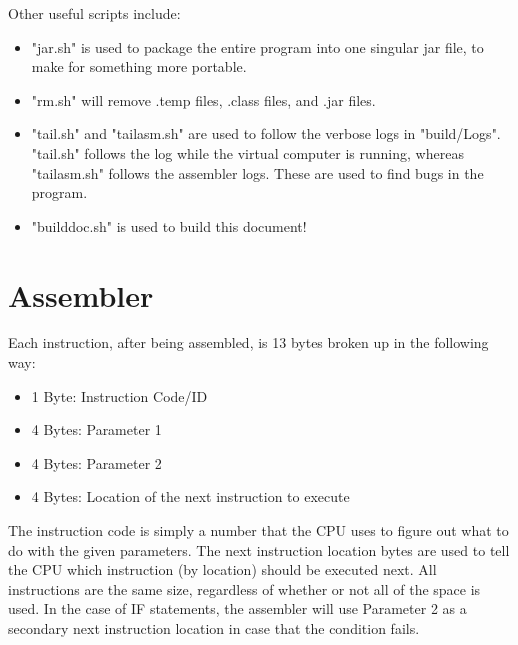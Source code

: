 \documentclass[12pt]{article}
\begin{document}
\vspace{12pt}

Other useful scripts include:

\begin{itemize}

\item
"jar.sh" is used to package the entire program into one singular jar file, to make for something more portable.

\item
"rm.sh" will remove .temp files, .class files, and .jar files.

\item
"tail.sh" and "tailasm.sh" are used to follow the verbose logs in "build/Logs".
"tail.sh" follows the log while the virtual computer is running,
whereas "tailasm.sh" follows the assembler logs.
These are used to find bugs in the program.

\item
"builddoc.sh" is used to build this document!

\end{itemize}



\section{Assembler}

\vspace{12pt}

Each instruction, after being assembled, is 13 bytes broken up in the following way:
\begin{itemize}

\item
1 Byte: Instruction Code/ID

\item
4 Bytes: Parameter 1

\item
4 Bytes: Parameter 2

\item
4 Bytes: Location of the next instruction to execute

\end{itemize}

\vspace{12pt}

The instruction code is simply a number that the CPU uses to figure out what to do with the given parameters.
The next instruction location bytes are used to tell the CPU which instruction (by location) should be executed next.
All instructions are the same size, regardless of whether or not all of the space is used.
In the case of IF statements, the assembler will use Parameter 2 as a secondary next instruction location
in case that the condition fails.
\end{document}
